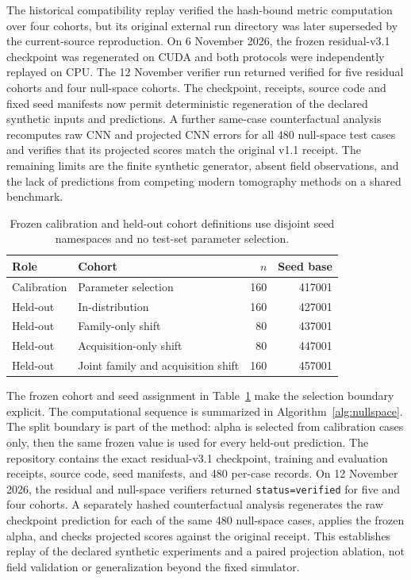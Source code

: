 \documentclass[11pt]{article}
\begin{document}


The historical compatibility replay verified the hash-bound metric computation over four cohorts, but its original external run directory was later superseded by the current-source reproduction. On 6 November 2026, the frozen residual-v3.1 checkpoint was regenerated on CUDA and both protocols were independently replayed on CPU. The 12 November verifier run returned verified for five residual cohorts and four null-space cohorts. The checkpoint, receipts, source code and fixed seed manifests now permit deterministic regeneration of the declared synthetic inputs and predictions. A further same-case counterfactual analysis recomputes raw CNN and projected CNN errors for all 480 null-space test cases and verifies that its projected scores match the original v1.1 receipt. The remaining limits are the finite synthetic generator, absent field observations, and the lack of predictions from competing modern tomography methods on a shared benchmark.

\begin{table}[htbp]
\centering
\caption{Frozen calibration and held-out cohort definitions use disjoint seed namespaces and no test-set parameter selection.}
\label{tab:cohort-design}
\begin{tabular}{llrr}
\toprule
Role & Cohort & $n$ & Seed base \\
\midrule
Calibration & Parameter selection & 160 & 417001 \\
Held-out & In-distribution & 160 & 427001 \\
Held-out & Family-only shift & 80 & 437001 \\
Held-out & Acquisition-only shift & 80 & 447001 \\
Held-out & Joint family and acquisition shift & 160 & 457001 \\
\bottomrule
\end{tabular}
\end{table}

The frozen cohort and seed assignment in Table~\ref{tab:cohort-design} make the selection boundary explicit. The computational sequence is summarized in Algorithm~\ref{alg:nullspace}. The split boundary is part of the method: alpha is selected from calibration cases only, then the same frozen value is used for every held-out prediction. The repository contains the exact residual-v3.1 checkpoint, training and evaluation receipts, source code, seed manifests, and 480 per-case records. On 12 November 2026, the residual and null-space verifiers returned \texttt{status=verified} for five and four cohorts. A separately hashed counterfactual analysis regenerates the raw checkpoint prediction for each of the same 480 null-space cases, applies the frozen alpha, and checks projected scores against the original receipt. This establishes replay of the declared synthetic experiments and a paired projection ablation, not field validation or generalization beyond the fixed simulator.
\end{document}
